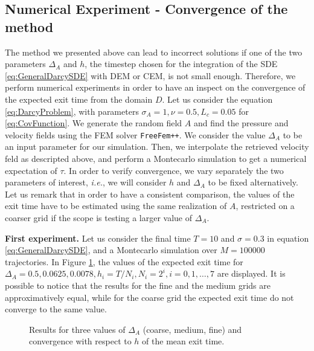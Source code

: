 \subsection{Numerical Experiment - Convergence of the method}

The method we presented above can lead to incorrect solutions if one of the two parameters $\Delta_A$ and $h$, the timestep chosen for the integration of the SDE \eqref{eq:GeneralDarcySDE} with DEM or CEM, is not small enough. Therefore, we perform numerical experiments in order to have an inspect on the convergence of the expected exit time from the domain $D$. Let us consider the equation \eqref{eq:DarcyProblem}, with parameters $\sigma_A = 1, \nu = 0.5, L_c = 0.05$ for \eqref{eq:CovFunction}. We generate the random field $A$ and find the pressure and velocity fields using the FEM solver \texttt{FreeFem++}. We consider the value $\Delta_A$ to be an input parameter for our simulation. Then, we interpolate the retrieved velocity feld as descripted above, and perform a Montecarlo simulation to get a numerical expectation of $\tau$. In order to verify convergence, we vary separately the two parameters of interest, \textit{i.e.}, we will consider $h$ and $\Delta_A$ to be fixed alternatively. Let us remark that in order to have a consistent comparison, the values of the exit time have to be estimated using the same realization of $A$, restricted on a coarser grid if the scope is testing a larger value of $\Delta_A$. 

\noindent \textbf{First experiment.} Let us consider the final time $T = 10$ and $\sigma = 0.3$ in equation \eqref{eq:GeneralDarcySDE}, and a Montecarlo simulation over $M = 100000$ trajectories. In Figure \ref{fig:ConvDeltaAh}, the values of the expected exit time for $\Delta_A = 0.5, 0.0625, 0.0078, h_i = T/N_i, N_i = 2^i, i = 0, 1, \dots, 7$ are displayed. It is possible to notice that the results for the fine and the medium grids are approximatively equal, while for the coarse grid the expected exit time do not converge to the same value. 

\begin{figure}[t]
    \centering
    \resizebox{0.8\linewidth}{!}{ }  
    \caption{Results for three values of $\Delta_A$ (coarse, medium, fine) and convergence with respect to $h$ of the mean exit time.}
    \label{fig:ConvDeltaAh}
\end{figure}
